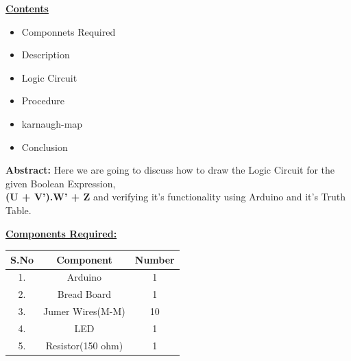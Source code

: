 \documentclass[10pt,a4paper]{report}
\begin{document}
\begin{multicols}{2} \raggedright \large \textbf{\underline{Contents}} \normalsize \vspace{5mm}
\begin{itemize}
\raggedright  \item Componnets Required \item Description \item Logic Circuit \item Procedure \item karnaugh-map \item Conclusion
\end{itemize} \vspace{5mm}
\raggedright \hspace{10mm} \textbf{Abstract:}  Here we are going to discuss how to draw the Logic Circuit for the given Boolean Expression,\\  \textbf{(U + V').W' + Z} and verifying it's functionality using Arduino and it's Truth Table.\vspace{5mm} 
\\ \raggedright \large \textbf{\underline{Components Required:}} \normalsize \vspace{3mm}

\begin{center}
    \setlength{\arrayrulewidth}{0.1mm}
	\setlength{\tabcolsep}{12pt}
	\renewcommand{\arraystretch}{1.5}
    \begin{tabular}{|c|c|c|}
    \hline 
    \textbf{S.No} & \textbf{Component} & \textbf{Number}\\
    \hline
	1. & Arduino & 1 \\
	2. & Bread Board & 1 \\
	3. & Jumer Wires(M-M) & 10 \\
	4. & LED & 1 \\
	5. & Resistor(150 ohm) & 1 \\ 
      \hline
      

\end{tabular}
\end{center}
\end{multicols}
\end{document}
